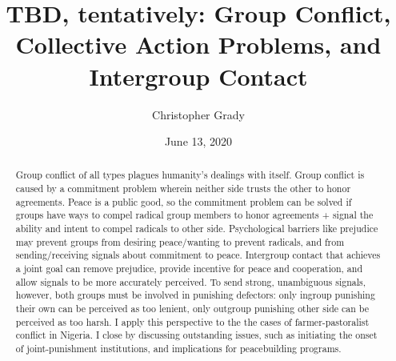 \documentclass[11pt]{article}
\title{TBD, tentatively: Group Conflict, Collective Action Problems, and
Intergroup Contact}
\author{
Christopher Grady
}
\date{June 13, 2020}
\begin{document}
\VerbatimFootnotes

%
%
%
%
%
%
%
%
%
%

\maketitle

\begin{abstract}

Group conflict of all types plagues humanity's dealings with itself.  Group conflict is caused by a commitment problem wherein neither side trusts the other to honor agreements.  Peace is a public good, so the commitment problem can be solved if groups have ways to compel radical group members to honor agreements + signal the ability and intent to compel radicals to other side.  Psychological barriers like prejudice may prevent groups from desiring peace/wanting to prevent radicals, and from sending/receiving signals about commitment to peace.  Intergroup contact that achieves a joint goal can remove prejudice, provide incentive for peace and cooperation, and allow signals to be more accurately perceived.  To send strong, unambiguous signals, however, both groups must be involved in punishing defectors: only ingroup punishing their own can be perceived as too lenient, only outgroup punishing other side can be perceived as too harsh.  I apply this perspective to the the cases of farmer-pastoralist conflict in Nigeria.  I close by discussing outstanding issues, such as initiating the onset of joint-punishment institutions, and implications for peacebuilding programs.

\end{abstract}
\end{document}
